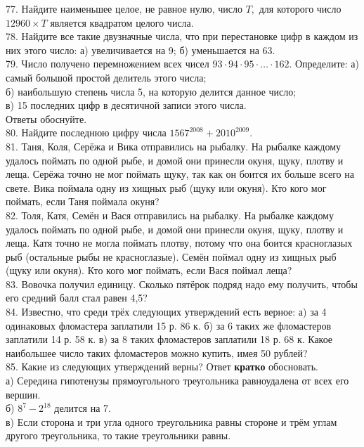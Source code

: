 \documentclass[12pt]{article}
\begin{document}
77. Найдите наименьшее целое, не равное нулю, число $T,$ для которого число $12960\times T$ является квадратом целого числа.\\
78. Найдите все такие двузначные числа, что при перестановке цифр в каждом из них этого число: а) увеличивается на 9; б) уменьшается на 63.\\
79. Число получено перемножением всех чисел $93\cdot94\cdot95\cdot\ldots\cdot162.$ Определите:
а) самый большой простой делитель этого числа;\\
б) наибольшую степень числа 5, на которую делится данное число;\\
в) 15 последних цифр в десятичной записи этого числа.\\
Ответы обоснуйте.\\
80. Найдите последнюю цифру числа $1567^{2008}+2010^{2009}.$\\
81. Таня, Коля, Серёжа и Вика отправились на рыбалку. На рыбалке каждому удалось поймать по одной рыбе, и домой они принесли окуня, щуку, плотву и леща. Серёжа точно не мог поймать щуку, так как он боится их больше всего на свете. Вика поймала одну из хищных рыб (щуку или окуня). Кто кого мог поймать, если Таня поймала окуня?\\
82. Толя, Катя, Семён и Вася отправились на рыбалку. На рыбалке каждому удалось поймать по одной рыбе, и домой они принесли окуня, щуку, плотву и леща. Катя точно не могла поймать плотву, потому что она боится красноглазых рыб (остальные рыбы не красноглазые). Семён поймал одну из хищных рыб (щуку или окуня). Кто кого мог поймать, если Вася поймал леща?\\
83. Вовочка получил единицу. Сколько пятёрок подряд надо ему получить, чтобы его средний балл стал равен 4,5?\\
84. Известно, что среди трёх следующих утверждений есть верное: а) за 4 одинаковых фломастера заплатили 15 р. 86 к. б) за 6 таких же фломастеров заплатили 14 р. 58 к. в) за 8 таких фломастеров заплатили 18 р. 68 к. Какое наибольшее число таких фломастеров можно купить, имея 50 рублей?\\
85. Какие из следующих утверждений верны? Ответ {\bf кратко} обосновать.\\
а) Середина гипотенузы прямоугольного треугольника равноудалена от всех его вершин.\\
б) $8^7-2^{18}$ делится на 7.\\
в) Если сторона и три угла одного треугольника равны стороне и трём углам другого треугольника, то такие треугольники равны.\\
\end{document}

